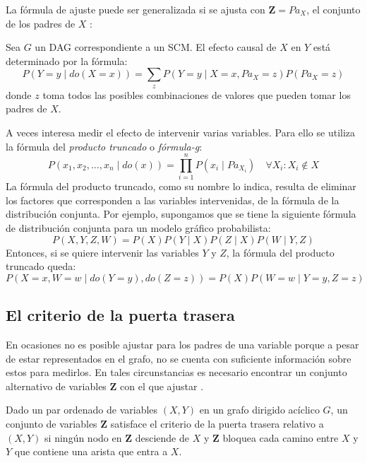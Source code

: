 La fórmula de ajuste puede ser generalizada si se ajusta con $\textbf{Z}=Pa_X$, el conjunto de los padres de $X$ \cite{pearl2016causal}:

\begin{theorem}
	Sea $G$ un DAG correspondiente a un SCM. El efecto causal de $X$ en $Y$ está determinado por la fórmula:
	\[ P(Y=y \mid do(X=x)) = \sum_{z} P(Y=y \mid X=x, Pa_X=z)P(Pa_X=z) \]
	donde $z$ toma todos las posibles combinaciones de valores que pueden tomar los padres de $X$.
\end{theorem}

A veces interesa medir el efecto de intervenir varias variables. Para ello se utiliza la fórmula del  \textit{producto truncado} o \textit{fórmula-g}:		
\[P(x_1,x_2,...,x_n \mid do(x))=\prod_{i=1}^{n}P(x_i \mid Pa_{X_i}) \quad \forall X_i: X_i \notin X\]
La fórmula del producto truncado, como su nombre lo indica, resulta de eliminar los factores que corresponden a las variables intervenidas, de la fórmula de la distribución conjunta. Por ejemplo, supongamos que se tiene la siguiente fórmula de distribución conjunta para un modelo gráfico probabilista:
\[ P(X,Y,Z,W)=P(X)P(Y \mid X)P(Z \mid X)P(W \mid Y, Z) \]
Entonces, si se quiere intervenir las variables $Y$ y $Z$, la fórmula del producto truncado queda:
\[ P(X=x, W=w \mid do(Y=y),do(Z=z)) = P(X)P(W=w \mid Y=y,Z=z)\]


\subsection{El criterio de la puerta trasera}
En ocasiones no es posible ajustar para los padres de una variable porque a pesar de estar representados en el grafo, no se cuenta con suficiente información sobre estos para medirlos. En tales circunstancias es necesario encontrar un conjunto alternativo de variables $\textbf{Z}$ con el que ajustar \cite{pearl2016causal}.

\begin{dfn}
	Dado un par ordenado de variables $(X,Y)$ en un grafo dirigido acíclico $G$, un conjunto de variables $\textbf{Z}$ satisface el criterio de la puerta trasera relativo a $(X,Y)$ si ningún nodo en $\textbf{Z}$ desciende de $X$ y $\textbf{Z}$ bloquea cada camino entre $X$ y $Y$ que contiene una arista que entra a $X$.
\end{dfn}

